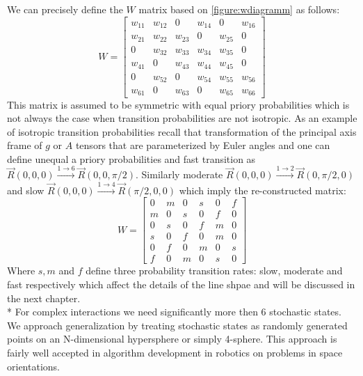 We can precisely define the $W$ matrix based on \ref{figure:wdiagramm} as follows: 
\begin{equation}\label{eq:Wmat1}
W = \begin{bmatrix}
       w_{11} & w_{12} & 0 & w_{14} & 0 & w_{16}  \\[0.3em]
       w_{21} & w_{22} & w_{23} & 0 & w_{25} & 0  \\[0.3em]
       0 & w_{32} & w_{33} & w_{34} & w_{35} & 0  \\[0.3em]
       w_{41} & 0 & w_{43} & w_{44} & w_{45} & 0 \\[0.3em]
       0 & w_{52} & 0 & w_{54} & w_{55} & w_{56} \\[0.3em]
       w_{61} & 0 & w_{63} & 0 & w_{65} & w_{66} 
     \end{bmatrix}
\end{equation}
This matrix is assumed to be symmetric with equal priory probabilities which is not always the case when transition probabilities are not isotropic. As an example of isotropic transition probabilities recall that transformation of the principal axis frame of $g$ or $A$ tensors that are parameterized by Euler angles and one can define unequal a priory probabilities and fast transition as $\vec{R}(0,0,0)\xrightarrow {1\rightarrow 6}\vec{R}(0,0,\pi/2)$. Similarly moderate $\vec{R}(0,0,0)\xrightarrow {1\rightarrow 2}\vec{R}(0,\pi/2,0)$  and slow $\vec{R}(0,0,0)\xrightarrow {1\rightarrow 4}\vec{R}(\pi/2,0,0)$ which imply the re-constructed matrix:   
\begin{equation}\label{eq:Wmat2}
W = \begin{bmatrix}
       0 & m & 0 & s & 0 & f  \\[0.3em]
       m & 0 & s & 0 & f & 0  \\[0.3em]
       0 & s & 0 & f & m & 0  \\[0.3em]
       s & 0 & f & 0 & m & 0 \\[0.3em]
       0 & f & 0 & m & 0 & s \\[0.3em]
       f & 0 & m & 0 & s & 0 
     \end{bmatrix}
\end{equation}
Where $s,m$ and $f$ define three probability transition rates: slow, moderate and fast respectively which affect the details of the line shpae and will be discussed in the next chapter.\\*
For complex interactions we need significantly more then 6 stochastic states. We approach generalization by treating stochastic states as randomly generated points on an N-dimensional hypersphere or simply 4-sphere. This approach is fairly well accepted in algorithm development in robotics on problems in space orientations\cite{robotics}\cite{ershova}. 
